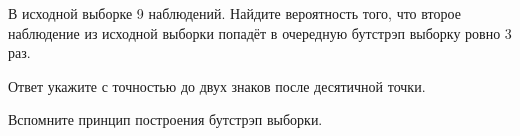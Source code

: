 
\begin{question}
В исходной выборке 9 наблюдений.
Найдите вероятность того, что второе наблюдение из исходной выборки попадёт в очередную бутстрэп выборку ровно 3 раз.

Ответ укажите с точностью до двух знаков после десятичной точки.
\end{question}

\begin{solution}
Вспомните принцип построения бутстрэп выборки.
\end{solution}

